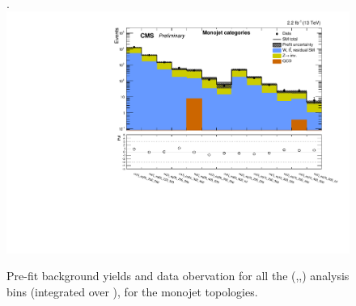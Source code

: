 \begin{figure}[tbhp]
\begin{center}
     \\
  \end{center}
\end{figure}


\clearpage

\clearpage

\clearpage


\clearpage

\clearpage

\clearpage





\clearpage
\begin{landscape}
  \begin{center}
    \begin{figure}[h!]
      \caption{Pre-fit background yields and data obervation for all the (\njet,\nb,\scalht) analysis bins (integrated over \MHT), for the monojet topologies. \label{fig:summaryPlot_prefit_Monojet}}.
      \includegraphics[width=0.8\linewidth]{figures/postFitResults/summaryPlots/summaryPlot_prefit_Monojet}
    \end{figure}
  \end{center}
\end{landscape}

